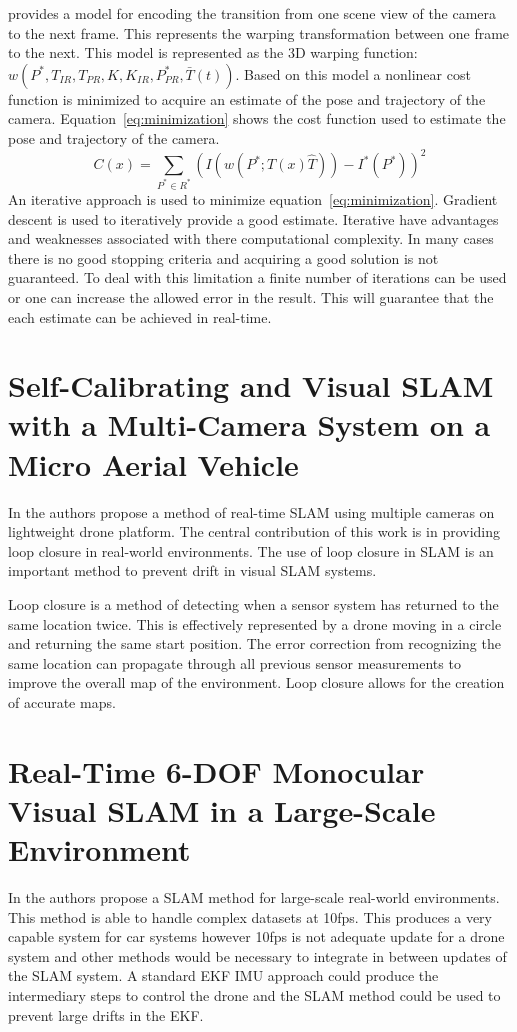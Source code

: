 \documentclass[conference]{IEEEtran}
\begin{document}
\cite{audras2011real} provides a model for encoding the transition from one scene view of the camera to the next frame. This represents the warping transformation between one frame to the next. This model is represented as the 3D warping function: $w(P^*, T_{IR}, T_{PR}, K, K_{IR}, P^*_{PR}, \bar{T}(t))$. Based on this model a nonlinear cost function is minimized to acquire an estimate of the pose and trajectory of the camera. Equation~\ref{eq:minimization} shows the cost function used to estimate the pose and trajectory of the camera.
\begin{equation}
\label{eq:minimization}
C(x) = \sum_{P^* \in R^*} \left ( I( w(P^*; T(x)\hat{T})) - I^*(P^*) \right )^2
\end{equation}
An iterative approach is used to minimize equation~\ref{eq:minimization}. Gradient descent is used to iteratively provide a good estimate. Iterative have advantages and weaknesses associated with there computational complexity. In many cases there is no good stopping criteria and acquiring a good solution is not guaranteed. To deal with this limitation a finite number of iterations can be used or one can increase the allowed error in the result. This will guarantee that the each estimate can be achieved in real-time.

\section{Self-Calibrating and Visual SLAM with a Multi-Camera System on a Micro Aerial Vehicle}
In \cite{heng2015self} the authors propose a method of real-time SLAM using multiple cameras on lightweight drone platform. The central contribution of this work is in providing loop closure in real-world environments. The use of loop closure in SLAM is an important method to prevent drift in visual SLAM systems.

Loop closure is a method of detecting when a sensor system has returned to the same location twice. This is effectively represented by a drone moving in a circle and returning the same start position. The error correction from recognizing the same location can propagate through all previous sensor measurements to improve the overall map of the environment. Loop closure allows for the creation of accurate maps.
\section{Real-Time 6-DOF Monocular Visual SLAM in a Large-Scale Environment}
In \cite{lim2014real} the authors propose a SLAM method for large-scale real-world environments. This method is able to handle complex datasets at 10fps. This produces a very capable system for car systems however 10fps is not adequate update for a drone system and other methods would be necessary to integrate in between updates of the SLAM system. A standard EKF IMU approach could produce the intermediary steps to control the drone and the SLAM method could be used to prevent large drifts in the EKF.
\end{document}
